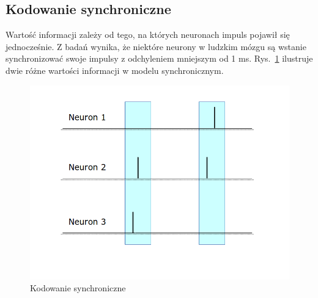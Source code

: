 \subsection{Kodowanie synchroniczne}
Wartość informacji zależy od tego, na których neuronach impuls pojawił się jednocześnie.
Z badań wynika, że niektóre neurony w ludzkim mózgu są wstanie synchronizować swoje impulsy z odchyleniem mniejszym od 1 ms.
Rys.~\ref{fig:CodingBySynchrony} ilustruje dwie różne wartości informacji w modelu synchronicznym.
	\begin{figure}[ht]
		\centering
		\includegraphics[width=\textwidth/2]{../CodingBySynchrony.png}
		\caption{Kodowanie synchroniczne}
                \label{fig:CodingBySynchrony}
	\end{figure}

